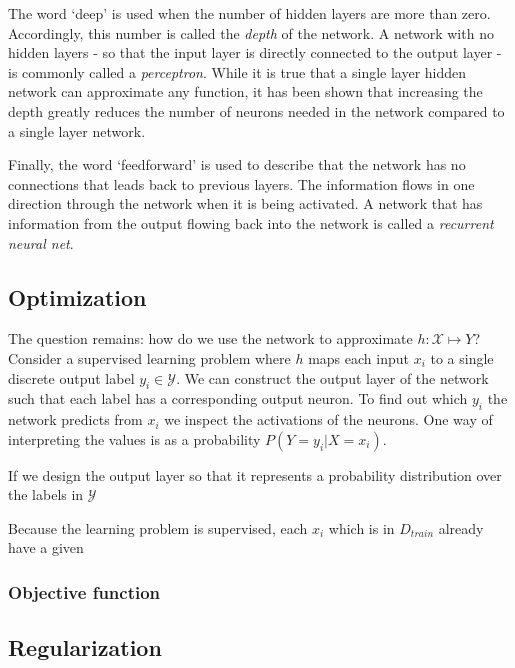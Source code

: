 


The word `deep' is used when the number of hidden layers are more than zero. Accordingly, this number is called the \emph{depth} of the network. A network with no hidden layers - so that the input layer is directly connected to the output layer - is commonly called a \emph{perceptron}. While it is true that a single layer hidden network can approximate any function, it has been shown that increasing the depth greatly reduces the number of neurons needed in the network compared to a single layer network. %

Finally, the word `feedforward' is used to describe that the network has no connections that leads back to previous layers. The information flows in one direction through the network when it is being activated. A network that has information from the output flowing back into the network is called a \emph{recurrent neural net}. 

\subsection{Optimization}
\label{nn_optimization}

The question remains: how do we use the network to approximate $h:\mathcal{X}\mapsto{Y}$? Consider a supervised learning problem where $h$ maps each input $x_i$ to a single discrete output label $y_i \in \mathcal{Y}$. We can construct the output layer of the network such that each label has a corresponding output neuron. To find out which $y_i$ the network predicts from $x_i$ we inspect the activations of the neurons. One way of interpreting the values is as a probability $P(Y = y_i | X = x_i)$. 


If we design the output layer so that it represents a probability distribution over the labels in $\mathcal{Y}$

Because the learning problem is supervised, each $x_i$ which is in $D_{train}$ already have a given

\subsubsection{Objective function}


\subsection{Regularization}

